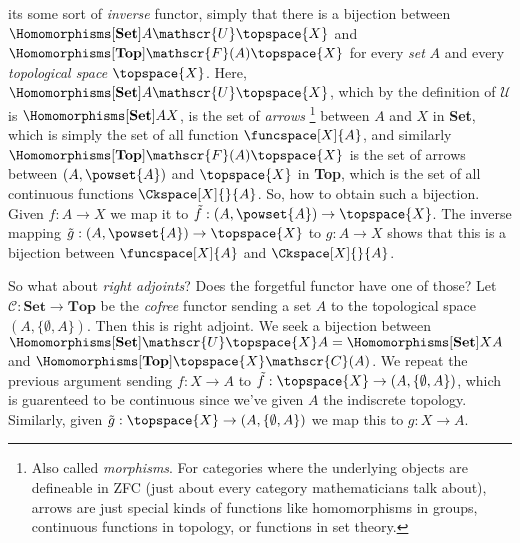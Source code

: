         its some sort of \textit{inverse} functor, simply that there is
        a bijection between
        $\Homomorphisms[\textbf{Set}]{A}{\mathscr{U}\topspace{X}}$
        and $\Homomorphisms[\textbf{Top}]{\mathscr{F}(A)}{\topspace{X}}$
        for every \textit{set} $A$ and every \textit{topological space}
        $\topspace{X}$. Here,
        $\Homomorphisms[\textbf{Set}]{A}{\mathscr{U}\topspace{X}}$,
        which by the definition of $\mathscr{U}$ is
        $\Homomorphisms[\textbf{Set}]{A}{X}$, is the set of \textit{arrows}%
        \footnote{%
            Also called \textit{morphisms}. For categories where the
            underlying objects are defineable in ZFC (just about every
            category mathematicians talk about), arrows are just special
            kinds of functions like homomorphisms in groups, continuous
            functions in topology, or functions in set theory.
        }
        between $A$ and $X$ in \textbf{Set}, which is simply the set of
        all function $\funcspace[X]{A}$, and similarly
        $\Homomorphisms[\textbf{Top}]{\mathscr{F}(A)}{\topspace{X}}$ is
        the set of arrows between $(A,\powset{A})$ and $\topspace{X}$ in
        \textbf{Top}, which is the set of all continuous functions
        $\Ckspace[X]{}{A}$. So, how to obtain such a bijection. Given
        $f:A\rightarrow{X}$ we map it to
        $\tilde{f}:(A,\powset{A})\rightarrow\topspace{X}$. The inverse
        mapping $\tilde{g}:(A,\powset{A})\rightarrow\topspace{X}$ to
        $g:A\rightarrow{X}$ shows that this is a bijection between
        $\funcspace[X]{A}$ and $\Ckspace[X]{}{A}$.
        \par\hfill\par
        So what about \textit{right adjoints}? Does the forgetful
        functor have one of those? Let
        $\mathscr{C}:\textbf{Set}\rightarrow\textbf{Top}$ be the
        \textit{cofree} functor sending a set $A$ to the topological
        space $(A,\{\emptyset,A\})$. Then this is right adjoint. We seek
        a bijection between
        $\Homomorphisms[\textbf{Set}]{\mathscr{U}\topspace{X}}{A}%
        =\Homomorphisms[\textbf{Set}]{X}{A}$ and
        $\Homomorphisms[\textbf{Top}]{\topspace{X}}{\mathscr{C}(A)}$. We
        repeat the previous argument sending $f:X\rightarrow{A}$ to
        $\tilde{f}:\topspace{X}\rightarrow(A,\{\emptyset,A\})$, which is
        guarenteed to be continuous since we've given $A$ the indiscrete
        topology. Similarly, given
        $\tilde{g}:\topspace{X}\rightarrow(A,\{\emptyset,A\})$ we map
        this to $g:X\rightarrow{A}$.
